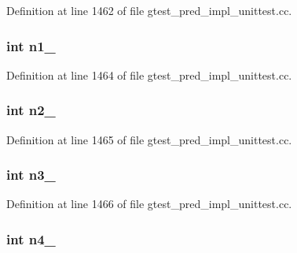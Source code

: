 \-Definition at line 1462 of file gtest\-\_\-pred\-\_\-impl\-\_\-unittest.\-cc.

\hypertarget{classPredicate4Test_a7a61c539c18d10f12696fc25b115d699}{
\subsubsection[{n1\-\_\-}]{\setlength{\rightskip}{0pt plus 5cm}int {\bf n1\-\_\-}}}\label{da/d30/classPredicate4Test_a7a61c539c18d10f12696fc25b115d699}


\-Definition at line 1464 of file gtest\-\_\-pred\-\_\-impl\-\_\-unittest.\-cc.

\hypertarget{classPredicate4Test_a7dc886196252de63d1ca064997069377}{
\subsubsection[{n2\-\_\-}]{\setlength{\rightskip}{0pt plus 5cm}int {\bf n2\-\_\-}}}\label{da/d30/classPredicate4Test_a7dc886196252de63d1ca064997069377}


\-Definition at line 1465 of file gtest\-\_\-pred\-\_\-impl\-\_\-unittest.\-cc.

\hypertarget{classPredicate4Test_a08d9124d5401436eacd3e57dae0dbe2f}{
\subsubsection[{n3\-\_\-}]{\setlength{\rightskip}{0pt plus 5cm}int {\bf n3\-\_\-}}}\label{da/d30/classPredicate4Test_a08d9124d5401436eacd3e57dae0dbe2f}


\-Definition at line 1466 of file gtest\-\_\-pred\-\_\-impl\-\_\-unittest.\-cc.

\hypertarget{classPredicate4Test_aff849f20105b63bab116cb4e43ea8486}{
\subsubsection[{n4\-\_\-}]{\setlength{\rightskip}{0pt plus 5cm}int {\bf n4\-\_\-}}}\label{da/d30/classPredicate4Test_aff849f20105b63bab116cb4e43ea8486}


